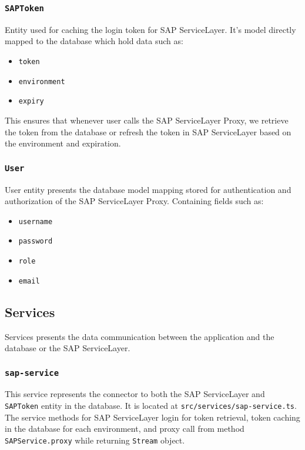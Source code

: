 \subsubsection{\texttt{SAPToken}}
Entity used for caching the login token for SAP ServiceLayer. 
It's model directly mapped to the database which hold data such as:
\begin{itemize}
    \item \texttt{token}
    \item \texttt{environment}
    \item \texttt{expiry}
\end{itemize}

This ensures that whenever user calls the SAP ServiceLayer Proxy, we retrieve the token from the database or refresh the token in SAP ServiceLayer based on the environment and expiration.


\subsubsection{\texttt{User}}
User entity presents the database model mapping stored for authentication and authorization of the SAP ServiceLayer Proxy.
Containing fields such as:
\begin{itemize}
    \item \texttt{username}
    \item \texttt{password}
    \item \texttt{role}
    \item \texttt{email}
\end{itemize}

\subsection{Services}
\label{attachments:programming-sap.overview.sevices}
Services presents the data communication between the application and the database or the SAP ServiceLayer.

\subsubsection{\texttt{sap-service}}
This service represents the connector to both the SAP ServiceLayer and \texttt{SAPToken} entity in the database.
It is located at \texttt{src/services/sap-service.ts}.
The service methods for SAP ServiceLayer login for token retrieval, token caching in the database for each environment, and proxy call from method \texttt{SAPService.proxy} while returning \texttt{Stream} object.


